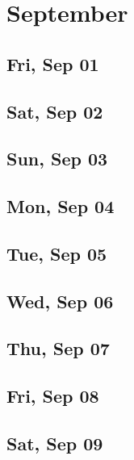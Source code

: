 \chapter{September}
	\section{Fri, Sep 01}
		
		
	\section{Sat, Sep 02}
		
		
	\section{Sun, Sep 03}
		
		
	\section{Mon, Sep 04}
		
		
	\section{Tue, Sep 05}
		
		
	\section{Wed, Sep 06}
		
		
	\section{Thu, Sep 07}
		
		
	\section{Fri, Sep 08}
		
		
	\section{Sat, Sep 09}
		
		
